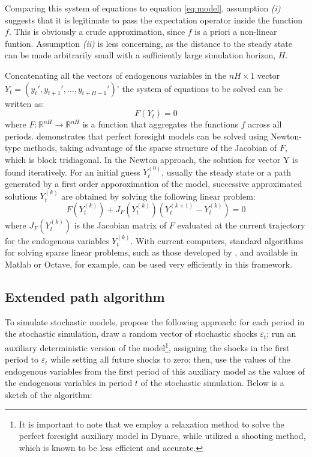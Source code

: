 \documentclass[a4paper,12pt]{amsart}
\begin{document}
\smallskip\smallskip

Comparing this system of equations to equation \ref{eq:model},
assumption \emph{(i)} suggests that it is legitimate to pass the
expectation operator inside the function \(f\). This is obviously a
crude approximation, since \(f\) is a priori a non-linear
funtion. Assumption \emph{(ii)} is less concerning, as the distance to
the steady state can be made arbitrarily small with a sufficiently
large simulation horizon, $H$.\newline

Concatenating all the vectors of endogenous variables in
the \(nH\times 1\)
vector \(Y_t = \left(y_t',y_{t+1}', \ldots, y_{t+H-1}' \right)\)' the
system of equations to be solved can be written as:
\[
   F(Y_t) = 0
\]
where $F: \mathbb{R}^{nH} \rightarrow \mathbb{R}^{nH}$ is a function
that aggregates the functions $f$ across all
periods. \textcite{Laffargue1990} demonstrates that perfect foresight
models can be solved using Newton-type methods, taking advantage of
the sparse structure of the Jacobian of $F$, which is block
tridiagonal. In the Newton approach, the solution for vector Y is
found iteratively. For an initial guess $Y_t^{(0)}$, usually the
steady state or a path generated by a first order apporoximation of
the model, successive approximated solutions $Y_t^{(k)}$ are obtained
by solving the following linear problem:
\[
   F\left( Y_t^{(k)} \right) + J_F\left(Y_t^{(k)}\right) \left( Y_t^{(k+1)} - Y_t^{(k)} \right)  = 0
\]
where $J_F\left(Y_t^{(k)}\right)$ is the Jacobian matrix of $F$
evaluated at the current trajectory for the endogenous
variables $Y_t^{(k)}$. With current computers, standard algorithms for
solving sparse linear problems, such as those developed by
\textcite{Davis2006}, and available in Matlab or Octave, for example,
can be used very efficiently in this framework.\newline

\subsection{Extended path algorithm}

To simulate stochastic models, \textcite{FairTaylor1983} propose the
following approach: for each period in the stochastic simulation, draw
a random vector of stochastic shocks \(\varepsilon_t\); run an
auxiliary deterministic version of the model\footnote{It is important
   to note that we employ a relaxation method to solve the perfect
   foresight auxiliary model in Dynare, while \textcite{FairTaylor1983}
   utilized a shooting method, which is known to be less efficient and
   accurate.}, assigning the shocks in the first period
to \(\varepsilon_t\) while setting all future shocks to zero; then,
use the values of the endogenous variables from the first period of
this auxiliary model as the values of the endogenous variables in
period \(t\) of the stochastic simulation. Below is a sketch of the algorithm:\newline
\end{document}
